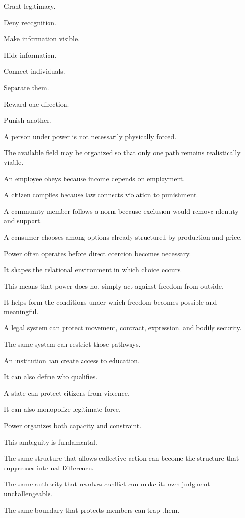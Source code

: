 Grant legitimacy.

Deny recognition.

Make information visible.

Hide information.

Connect individuals.

Separate them.

Reward one direction.

Punish another.

A person under power is not necessarily physically forced.

The available field may be organized so that only one path remains realistically viable.

An employee obeys because income depends on employment.

A citizen complies because law connects violation to punishment.

A community member follows a norm because exclusion would remove identity and support.

A consumer chooses among options already structured by production and price.

Power often operates before direct coercion becomes necessary.

It shapes the relational environment in which choice occurs.

This means that power does not simply act against freedom from outside.

It helps form the conditions under which freedom becomes possible and meaningful.

A legal system can protect movement, contract, expression, and bodily security.

The same system can restrict those pathways.

An institution can create access to education.

It can also define who qualifies.

A state can protect citizens from violence.

It can also monopolize legitimate force.

Power organizes both capacity and constraint.

This ambiguity is fundamental.

The same structure that allows collective action can become the structure that suppresses internal Difference.

The same authority that resolves conflict can make its own judgment unchallengeable.

The same boundary that protects members can trap them.

